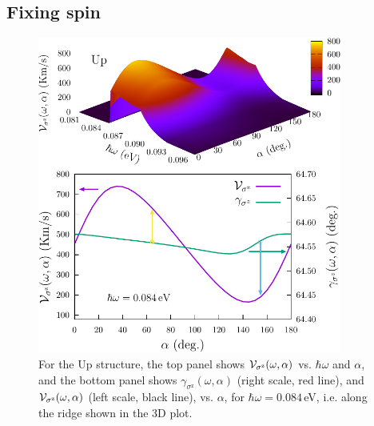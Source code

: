 \documentclass[floatfix,prb,aps,superscriptaddress,showpacs,11pt,preprint,letterpaper]{revtex4}
\def\tama{10cm}
\begin{document}
\subsection{Fixing spin} %
\label{sec:res-fixspin}

\begin{figure}[t]
\centering
\includegraphics[width=\tama]{figures/fig4}
\caption{For the Up structure, the top panel shows ${\cal V}_{\sigma^\mathrm{z}}
(\omega,\alpha)$ vs. $\hbar\omega$ and $\alpha$, and the bottom panel shows
$\gamma_{\sigma^\mathrm{z}}(\omega,\alpha)$ (right scale, red line), and ${\cal
V}_{\sigma^\mathrm{z}}(\omega,\alpha)$ (left scale, black line), vs. $\alpha$,
for $\hbar\omega=0.084$\,eV, i.e. along the ridge shown in the 3D plot. }
\label{fig:up-vsz-w1}
\end{figure}
\end{document}
